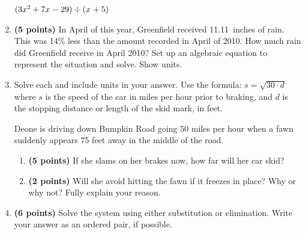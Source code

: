 \documentclass[12pt]{amsart}
\begin{document}
\begin{enumerate}
\vspace{3mm}

$(3x^{2}+7x^{}-29) \div (x^{}+5)$

\vfill  \vfill \vfill
\newpage\def \discount{14}\def \paid{1193.66}\def \rainy{11.11}\def \orcost{1387.98}\def \purcost{1047.07}\def \orrainy{12.92}
\item {\bf (5 points)} 
 In April of this year, Greenfield received \rainy\ inches of rain. This was \discount\% less than the amount recorded in April of 2010. How much rain did Greenfield  receive in April 2010? Set up an algebraic equation to represent the situation and solve. Show units.

\vfill 
\def \insvar{30}\def \d{75}\def \zerospeed{47.43}\def \slimit{50}\def \s{61}\def \skidd{124.033}\def \safed{83.333}\def \rsafed{83}

 
\item Solve each and include units in your answer. Use the formula: $s = \sqrt{\insvar \cdot d}$ where $s$ is the speed of the car in miles per hour prior to braking, and $d$ is the stopping distance or length of the skid mark, in feet. 

\vspace{3mm}

Deone is driving down Bumpkin Road going $\slimit$ miles per hour when a fawn suddenly appears $\d$ feet away in the middle of the road. \begin{enumerate}
\item {\bf (5 points)} If she slams on her brakes now, how far will her car skid? \vspace{4cm}
\item {\bf (2 points)} Will she avoid hitting the fawn if it freezes in place? Why or why not? Fully explain your reason. \vspace{3cm}
\end{enumerate}


\newpage\def \xis{-4}\def \yis{2}\def \nomatcho{[2,5,5,3]}\def \a{-2}\def \c{-5}\def \b{5}\def \d{-3}\def \polyonesol{18}\def \polytwosol{14}\def \xgoodone{-2x^{}}\def \ygoodone{+5y^{}}\def \xgoodtwo{-5x^{}}\def \ygoodtwo{-3y^{}}\def \unitize{[1,0,0,0,1,0]}\def \mtem{-2}\def \ntem{-5}\def \ptem{-5}\def \qtem{-5}\def \m{1}\def \n{-5}\def \p{-5}\def \q{-5}\def \polytonesol{-14}\def \polyttwosol{10}\def \xtgoodone{x^{}}\def \ytgoodone{-5y^{}}\def \xtgoodtwo{-5x^{}}\def \ytgoodtwo{-5y^{}}
\item {\bf (6 points)} 
 Solve the system using either substitution or elimination. Write your answer as an ordered pair, if possible. 


\end{enumerate}
\end{document}

